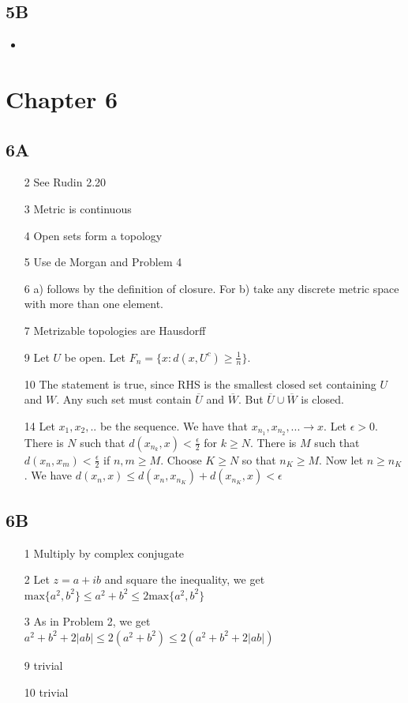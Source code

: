 \documentclass{article}
\begin{document}
\subsection*{5B}

\begin{itemize}
    \item 
\end{itemize}

\section*{Chapter 6}
\subsection*{6A}
\begin{itemize}
    \item[2] See Rudin 2.20
    \item[3] Metric is continuous
    \item[4] Open sets form a topology
    \item[5] Use de Morgan and Problem 4
    \item[6] a) follows by the definition of closure. For b) take any discrete metric space with more than one element. 
    \item[7] Metrizable topologies are Hausdorff 
    \item[9] Let $U$ be open. Let $F_n=\{x:d(x,U^c)\geq\frac{1}{n}\}$.
    \item[10] The statement is true, since RHS is the smallest closed set containing $U$ and $W$. Any such set must contain $\overline{U}$ and $\overline{W}$. But $\overline{U}\cup\overline{W}$ is closed.
    \item[14] Let $x_1,x_2,..$ be the sequence. We have that $x_{n_1},x_{n_2},... \to x$. Let $\epsilon>0$. There is $N$ such that $d(x_{n_k},x)<\frac{\epsilon}{2}$ for $k \geq N$. There is $M$ such that $d(x_n,x_m)<\frac{\epsilon}{2}$ if $n,m\geq M$. Choose $K\geq N$  so that $n_K\geq M$. Now let $n\geq n_K$. We have $d(x_n,x)\leq d(x_n,x_{n_K})+d(x_{n_K},x)<\epsilon$ 
\end{itemize}
\subsection*{6B}
\begin{itemize}
    \item [1] Multiply by complex conjugate
    \item[2] Let $z=a+ib$ and square the inequality, we get $\text{max}\{a^2,b^2\}\leq a^2+b^2 \leq 2\text{max}\{a^2,b^2\}$
    \item[3] As in Problem 2, we get $a^2+b^2+2|ab|\leq 2(a^2+b^2)\leq 2(a^2+b^2+2|ab|)$ 
    \item[9] trivial
    \item[10]trivial 
\end{itemize}
\end{document}
